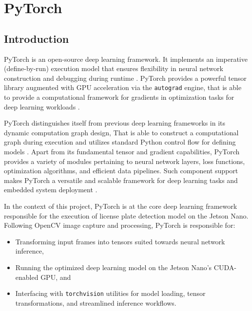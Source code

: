 %
%
%
\newpage
\section{PyTorch}


\subsection{Introduction}

\noindent
PyTorch is an open-source deep learning framework. It implements an imperative (define-by-run) execution model that ensures flexibility in neural network construction and debugging during runtime \cite{paszke2019pytorch}. PyTorch provides a powerful tensor library augmented with GPU acceleration via the \texttt{autograd} engine, that is able to provide a computational framework for gradients in  optimization tasks for deep learning workloads \cite{pytorchdocs}.

PyTorch distinguishes itself from previous deep learning frameworks in its dynamic computation graph design, That is able to construct a computational graph during execution and utilizes standard Python control flow for defining models \cite{goodfellow2016deep}. Apart from its fundamental tensor and gradient capabilities, PyTorch provides a variety of modules  pertaining to neural network layers, loss functions, optimization algorithms, and efficient data pipelines. Such  component support makes PyTorch a versatile and scalable framework for deep learning tasks and embedded system deployment \cite{pinto2022springer}.

In the context of this project, PyTorch is at the core deep learning framework responsible for the execution of license plate detection model on the Jetson Nano. Following OpenCV image capture and processing, PyTorch is responsible for:

\begin{itemize}
	\item Transforming input frames into tensors suited towards neural network inference,
	\item Running the optimized deep learning model on the Jetson Nano’s CUDA-enabled GPU, and
	\item Interfacing with \texttt{torchvision} utilities for model loading, tensor transformations, and streamlined inference workflows.
\end{itemize}

